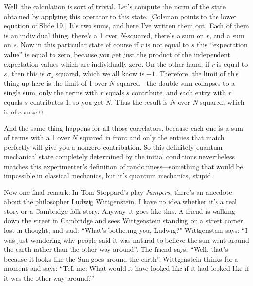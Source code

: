 \documentclass[twocolumn,prb]{revtex4}
\begin{document}
Well, the calculation is sort of trivial. Let's compute the norm of the state obtained by applying this operator to this state.  [Coleman points to the lower equation of Slide 19.]  It's two sums, and here I've written them out. Each of them is an individual thing, there's a 1 over $N$-squared, there's a sum on $r$, and a sum on $s$. Now in this particular state of course if $r$ is not equal to $s$ this ``expectation value'' is equal to zero, because you get just the product of the independent expectation values which are individually zero. On the other hand, if $r$ is equal to $s$, then this is $\sigma_z$ squared, which we all know is $+1$. Therefore, the limit of this thing up here is the limit of 1 over $N$ squared---the double sum collapses to a single sum, only the terms with $r$ equals $s$ contribute, and each entry with $r$ equals $s$ contributes 1, so you get $N$. Thus the result is $N$ over $N$ squared, which is of course 0.

And the same thing happens for all those correlators, because each one is a sum of terms with a 1 over $N$ squared in front and only the entries that match perfectly will give you a nonzero contribution. So this definitely quantum mechanical state completely determined by the initial conditions nevertheless matches this experimenter's definition of randomness---something that would be impossible in classical mechanics, but it's quantum mechanics, stupid.

Now one final remark:
In Tom Stoppard's play \emph{Jumpers}, there's an anecdote about the philosopher Ludwig Wittgenstein. I have no idea whether it's a real story or a Cambridge folk story\cite{stoppard}. Anyway, it goes like this.  A friend is walking down the street in Cambridge and sees Wittgenstein standing on a street corner lost in thought, and said: ``What's bothering you, Ludwig?'' Wittgenstein says: ``I was just wondering why people said it was natural to believe the sun went around the earth rather than the other way around''. The friend says: ``Well, that's because it looks like the Sun goes around the earth''. Wittgenstein thinks for a moment and says: ``Tell me: What would it have looked like if it had looked like if it was the other way around?''

\end{document}
